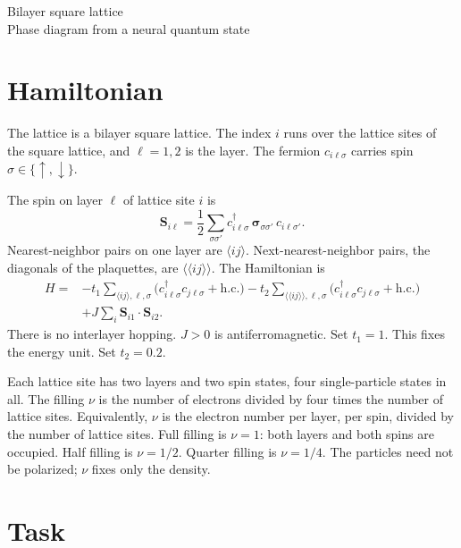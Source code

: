 \documentclass[11pt]{article}
\begin{document}
\begin{center}
{\Large Bilayer square lattice}\\[0.35em]
{\large Phase diagram from a neural quantum state}
\end{center}

\section{Hamiltonian}

The lattice is a bilayer square lattice. The index $i$ runs over the lattice sites of the square lattice, and $\ell=1,2$ is the layer. The fermion $c_{i\ell\sigma}$ carries spin $\sigma\in\{\uparrow,\downarrow\}$.

The spin on layer $\ell$ of lattice site $i$ is
\begin{equation}
\bm S_{i\ell}=\frac12\sum_{\sigma\sigma'}c_{i\ell\sigma}^{\dagger}\,\bm\sigma_{\sigma\sigma'}\,c_{i\ell\sigma'}.
\end{equation}
Nearest-neighbor pairs on one layer are $\langle ij\rangle$. Next-nearest-neighbor pairs, the diagonals of the plaquettes, are $\langle\langle ij\rangle\rangle$. The Hamiltonian is
\begin{equation}
\begin{aligned}
H={}&-t_1\sum_{\langle ij\rangle,\ell,\sigma}\bigl(c_{i\ell\sigma}^{\dagger}c_{j\ell\sigma}+\mathrm{h.c.}\bigr)
-t_2\sum_{\langle\langle ij\rangle\rangle,\ell,\sigma}\bigl(c_{i\ell\sigma}^{\dagger}c_{j\ell\sigma}+\mathrm{h.c.}\bigr)\\
&+J\sum_{i}\bm S_{i1}\cdot\bm S_{i2}.
\end{aligned}
\end{equation}
There is no interlayer hopping. $J>0$ is antiferromagnetic. Set $t_1=1$. This fixes the energy unit. Set $t_2=0.2$.

Each lattice site has two layers and two spin states, four single-particle states in all. The filling $\nu$ is the number of electrons divided by four times the number of lattice sites. Equivalently, $\nu$ is the electron number per layer, per spin, divided by the number of lattice sites. Full filling is $\nu=1$: both layers and both spins are occupied. Half filling is $\nu=1/2$. Quarter filling is $\nu=1/4$. The particles need not be polarized; $\nu$ fixes only the density.

\section{Task}
\end{document}
